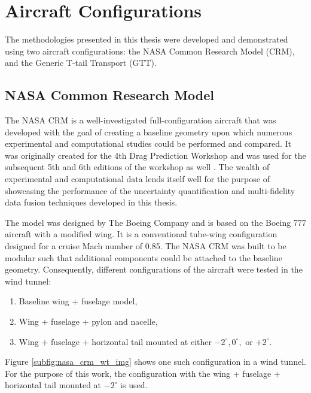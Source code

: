 \section{Aircraft Configurations}

The methodologies presented in this thesis were developed and demonstrated using two aircraft configurations: the NASA Common Research Model (CRM), and the Generic T-tail Transport (GTT). 

\subsection{NASA Common Research Model}
The NASA CRM is a well-investigated full-configuration aircraft \cite{rivers_further_2012,rivers_experimental_2010} that was developed with the goal of creating a baseline geometry upon which numerous experimental and computational studies could be performed and compared.
It was originally created for the 4th Drag Prediction Workshop \cite{morrison20094th} and was used for the subsequent 5th and 6th editions of the workshop as well \cite{levy2013summary,morrison20166th,roy2017summary,tinoco2017summary}.
The wealth of experimental and computational data lends itself well for the purpose of showcasing the performance of the uncertainty quantification and multi-fidelity data fusion techniques developed in this thesis.

The model was designed by The Boeing Company and is based on the Boeing 777 aircraft with a modified wing. 
It is a conventional tube-wing configuration designed for a cruise Mach number of 0.85.
The NASA CRM was built to be modular such that additional components could be attached to the baseline geometry. 
Consequently, different configurations of the aircraft were tested in the wind tunnel:
\begin{enumerate}
    \item Baseline wing + fuselage model,
    \item Wing + fuselage + pylon and nacelle,
    \item Wing + fuselage + horizontal tail mounted at either $-2^\circ, 0^\circ,$ or $+2^\circ$.
\end{enumerate}
Figure \ref{subfig:nasa_crm_wt_img} shows one such configuration in a wind tunnel. 
For the purpose of this work, the configuration with the wing + fuselage + horizontal tail mounted at $-2^\circ$ is used. 




